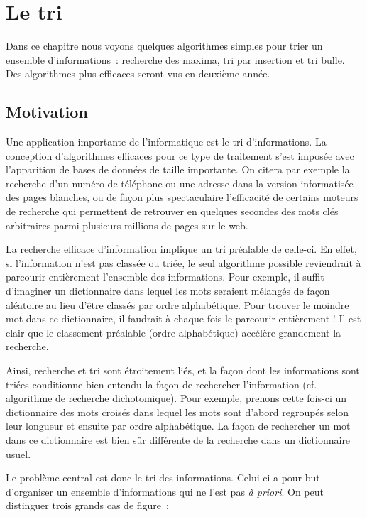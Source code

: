 \chapter{Le tri}

		Dans ce chapitre nous voyons quelques algorithmes simples pour trier un
		ensemble d'informations~: recherche des maxima, tri
		par insertion et tri bulle. Des algorithmes plus efficaces seront vus
		en deuxième année.


\section{Motivation}

	Une application importante de l’informatique est le tri d’informations.
	La conception d’algorithmes efficaces pour ce type de traitement s’est
	imposée avec l’apparition de bases de données de taille importante. On
	citera par exemple la recherche d’un numéro de téléphone ou une adresse
	dans la version informatisée des pages blanches, ou de façon plus
	spectaculaire l’efficacité de certains moteurs de recherche qui
	permettent de retrouver en quelques secondes des mots clés arbitraires
	parmi plusieurs millions de pages sur le web.


	La recherche efficace d’information implique un tri préalable de
	celle-ci. En effet, si l’information n’est pas classée ou triée, le
	seul algorithme possible reviendrait à parcourir entièrement l’ensemble
	des informations. Pour exemple, il suffit d’imaginer un dictionnaire
	dans lequel les mots seraient mélangés de façon aléatoire au lieu
	d’être classés par ordre alphabétique. Pour trouver le moindre mot dans
	ce dictionnaire, il faudrait à chaque fois le parcourir entièrement !
	Il est clair que le classement préalable (ordre alphabétique) accélère
	grandement la recherche.


	Ainsi, recherche et tri sont étroitement liés, et la façon dont les
	informations sont triées conditionne bien entendu la façon de
	rechercher l’information (cf. algorithme de recherche dichotomique).
	Pour exemple, prenons cette fois-ci un dictionnaire des mots croisés
	dans lequel les mots sont d’abord regroupés selon leur longueur et
	ensuite par ordre alphabétique. La façon de rechercher un mot dans ce
	dictionnaire est bien sûr différente de la recherche dans un
	dictionnaire usuel. 

	Le problème central est donc le tri des informations. Celui-ci a pour
	but d’organiser un ensemble d’informations qui ne l’est pas \textit{à
	priori}. On peut distinguer trois grands cas de figure~:

